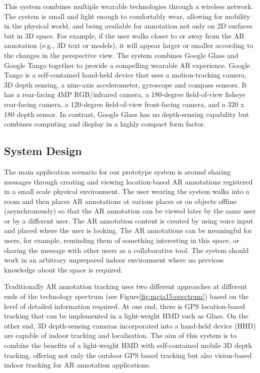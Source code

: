 This system combines multiple wearable technologies through a wireless network. The system is small and light enough to comfortably wear, allowing for mobility in the physical world, and being available for annotation not only on 2D surfaces but in 3D space. For example, if the user walks closer to or away from the AR annotation (e.g., 3D text or models), it will appear larger or smaller according to the changes in the perspective view. The system combines Google Glass and Google Tango together to provide a compelling wearable AR experience. Google Tango is a self-contained hand-held device that uses a motion-tracking camera, 3D depth sensing, a nine-axis accelerometer, gyroscope and compass sensors. It has a rear-facing 4MP RGB/infrared camera, a 180-degree field-of-view fisheye rear-facing camera, a 120-degree field-of-view front-facing camera, and a 320 x 180 depth sensor. In contrast, Google Glass has no depth-sensing capability but combines computing and display in a highly compact form factor. 



\subsection{System Design}

The main application scenario for our prototype system is around sharing messages through creating and viewing location-based AR annotations registered in a small scale physical environment. The user wearing the system walks into a room and then places AR annotations at various places or on objects offline (asynchronously) so that the AR annotation can be viewed later by the same user or by a different user. The AR annotation content is created by using voice input and placed where the user is looking. The AR annotations can be meaningful for users, for example, reminding them of something interesting in this space, or sharing the message with other users as a collaborative tool. The system should work in an arbitrary unprepared indoor environment where no previous knowledge about the space is required. 

Traditionally AR annotation tracking uses two different approaches at different ends of the technology spectrum (see Figure\ref{fig:mgia15:spectrum}) based on the level of detailed information required. At one end, there is GPS location-based tracking that can be implemented in a light-weight HMD such as Glass. On the other end, 3D depth-sensing cameras incorporated into a hand-held device (HHD) are capable of indoor tracking and localisation. The aim of this system is to combine the benefits of a light-weight HMD with self-contained mobile 3D depth tracking, offering not only the outdoor GPS based tracking but also vision-based indoor tracking for AR annotation applications. 

